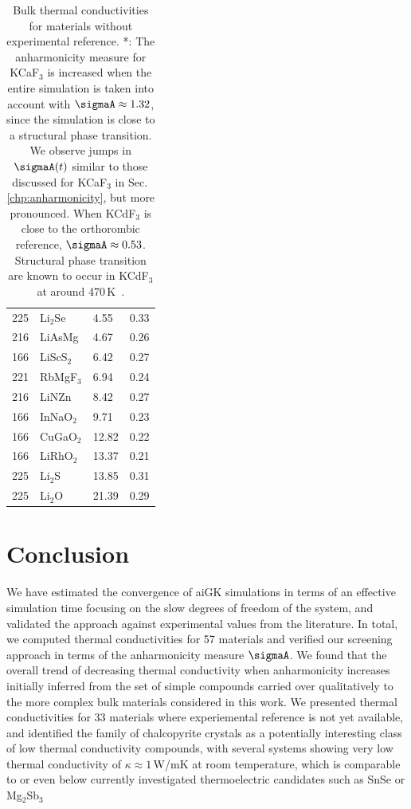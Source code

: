 \begin{table}[ht]
\begin{tabularx}{\linewidth}{rXXX}
         225 &   Li$_2$Se &             4.55 &       0.33 \\
         216 &     LiAsMg &             4.67 &       0.26 \\
         166 &  LiScS$_2$ &             6.42 &       0.27 \\
         221 &  RbMgF$_3$ &             6.94 &       0.24 \\
         216 &      LiNZn &             8.42 &       0.27 \\
         166 &  InNaO$_2$ &             9.71 &       0.23 \\
         166 &  CuGaO$_2$ &            12.82 &       0.22 \\
         166 &  LiRhO$_2$ &            13.37 &       0.21 \\
         225 &    Li$_2$S &            13.85 &       0.31 \\
         225 &    Li$_2$O &            21.39 &       0.29 \\
\bottomrule
\end{tabularx}
  \caption{Bulk thermal conductivities for materials without experimental reference. *: The anharmonicity measure for KCaF$_3$ is increased when the entire simulation is taken into account with $\sigmaA \approx 1.32$, since the simulation is close to a structural phase transition. We observe jumps in $\sigmaA (t)$ similar to those discussed for KCaF$_3$ in Sec.\,\ref{chp:anharmonicity}, but more pronounced. When KCdF$_3$ is close to the orthorombic reference, $\sigmaA \approx 0.53$. Structural phase transition are known to occur in KCdF$_3$ at around 470\,K~\cite{hidaka1977,hidaka1990}.}
  \label{tab:kappa.noexp}
\end{table}

\section{Conclusion}
We have estimated the convergence of aiGK simulations in terms of an effective simulation time focusing on the slow degrees of freedom of the system, and validated the approach against experimental values from the literature. In total, we computed thermal conductivities for 57 materials and verified our screening approach in terms of the anharmonicity measure $\sigmaA$. We found that the overall trend of decreasing thermal conductivity when anharmonicity increases initially inferred from the set of simple compounds carried over qualitatively to the more complex bulk materials considered in this work. We presented thermal conductivities for 33 materials where experiemental reference is not yet available, and identified the family of chalcopyrite crystals as a potentially interesting class of low thermal conductivity compounds, with several systems showing very low thermal conductivity of $\kappa \approx 1$\,W/mK at room temperature, which is comparable to or even below currently investigated thermoelectric candidates such as SnSe or Mg$_2$Sb$_3$~\cite{zhao2014,wei2016,sassi2014,pan2020,kajikawa2003,condron2006,zhang2009,zhang2018,ding2021}

